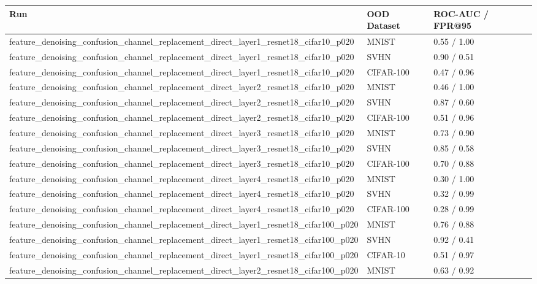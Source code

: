 \begin{tabular}{lll}
\toprule
Run & OOD Dataset & ROC-AUC / FPR@95 \\
\midrule
feature\_denoising\_confusion\_channel\_replacement\_direct\_layer1\_resnet18\_cifar10\_p020 & MNIST & 0.55 / 1.00 \\
feature\_denoising\_confusion\_channel\_replacement\_direct\_layer1\_resnet18\_cifar10\_p020 & SVHN & 0.90 / 0.51 \\
feature\_denoising\_confusion\_channel\_replacement\_direct\_layer1\_resnet18\_cifar10\_p020 & CIFAR-100 & 0.47 / 0.96 \\
feature\_denoising\_confusion\_channel\_replacement\_direct\_layer2\_resnet18\_cifar10\_p020 & MNIST & 0.46 / 1.00 \\
feature\_denoising\_confusion\_channel\_replacement\_direct\_layer2\_resnet18\_cifar10\_p020 & SVHN & 0.87 / 0.60 \\
feature\_denoising\_confusion\_channel\_replacement\_direct\_layer2\_resnet18\_cifar10\_p020 & CIFAR-100 & 0.51 / 0.96 \\
feature\_denoising\_confusion\_channel\_replacement\_direct\_layer3\_resnet18\_cifar10\_p020 & MNIST & 0.73 / 0.90 \\
feature\_denoising\_confusion\_channel\_replacement\_direct\_layer3\_resnet18\_cifar10\_p020 & SVHN & 0.85 / 0.58 \\
feature\_denoising\_confusion\_channel\_replacement\_direct\_layer3\_resnet18\_cifar10\_p020 & CIFAR-100 & 0.70 / 0.88 \\
feature\_denoising\_confusion\_channel\_replacement\_direct\_layer4\_resnet18\_cifar10\_p020 & MNIST & 0.30 / 1.00 \\
feature\_denoising\_confusion\_channel\_replacement\_direct\_layer4\_resnet18\_cifar10\_p020 & SVHN & 0.32 / 0.99 \\
feature\_denoising\_confusion\_channel\_replacement\_direct\_layer4\_resnet18\_cifar10\_p020 & CIFAR-100 & 0.28 / 0.99 \\
feature\_denoising\_confusion\_channel\_replacement\_direct\_layer1\_resnet18\_cifar100\_p020 & MNIST & 0.76 / 0.88 \\
feature\_denoising\_confusion\_channel\_replacement\_direct\_layer1\_resnet18\_cifar100\_p020 & SVHN & 0.92 / 0.41 \\
feature\_denoising\_confusion\_channel\_replacement\_direct\_layer1\_resnet18\_cifar100\_p020 & CIFAR-10 & 0.51 / 0.97 \\
feature\_denoising\_confusion\_channel\_replacement\_direct\_layer2\_resnet18\_cifar100\_p020 & MNIST & 0.63 / 0.92 \\

\end{tabular}
